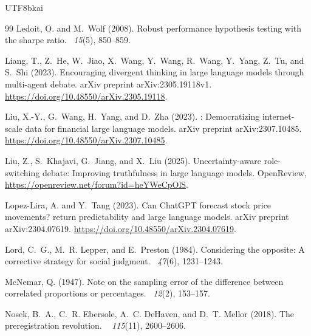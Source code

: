 \documentclass[12pt,a4paper]{article}
\begin{document}
\begin{CJK}{UTF8}{bkai}
\begin{thebibliography}{99}
Ledoit, O. and M.~Wolf (2008).
\newblock Robust performance hypothesis testing with the sharpe ratio.
~{\em 15\/}(5), 850--859.

Liang, T., Z.~He, W.~Jiao, X.~Wang, Y.~Wang, R.~Wang, Y.~Yang, Z.~Tu, and
  S.~Shi (2023).
\newblock Encouraging divergent thinking in large language models through
  multi-agent debate.
\newblock arXiv preprint arXiv:2305.19118v1.
\newblock \url{https://doi.org/10.48550/arXiv.2305.19118}.

Liu, X.-Y., G.~Wang, H.~Yang, and D.~Zha (2023).
: Democratizing internet-scale data for financial large
  language models.
\newblock arXiv preprint arXiv:2307.10485.
\newblock \url{https://doi.org/10.48550/arXiv.2307.10485}.

Liu, Z., S.~Khajavi, G.~Jiang, and X.~Liu (2025).
\newblock Uncertainty-aware role-switching debate: Improving truthfulness in
  large language models.
\newblock OpenReview, \url{https://openreview.net/forum?id=heYWeCpOlS}.

Lopez-Lira, A. and Y.~Tang (2023).
\newblock Can {ChatGPT} forecast stock price movements? return predictability
  and large language models.
\newblock arXiv preprint arXiv:2304.07619.
\newblock \url{https://doi.org/10.48550/arXiv.2304.07619}.

Lord, C.~G., M.~R. Lepper, and E.~Preston (1984).
\newblock Considering the opposite: A corrective strategy for social judgment.
~{\em 47\/}(6),
  1231--1243.

McNemar, Q. (1947).
\newblock Note on the sampling error of the difference between correlated
  proportions or percentages.
~{\em 12\/}(2), 153--157.

Nosek, B.~A., C.~R. Ebersole, A.~C. DeHaven, and D.~T. Mellor (2018).
\newblock The preregistration revolution.
~{\em
  115\/}(11), 2600--2606.


\end{thebibliography}
\end{CJK}
\end{document}
